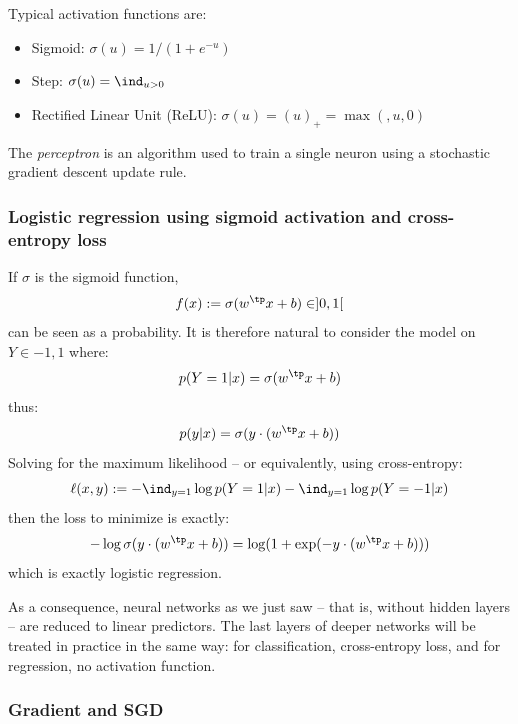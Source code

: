 \documentclass[toc, titlepaged]{../cs-classes/cs-classes}
\begin{document}
Typical activation functions are:
\begin{itemize}
    \item Sigmoid: $\sigma(u)=1/(1+e^{-u})$
    \item Step: $\sigma(u)=\ind_{u>0}$
    \item Rectified Linear Unit (ReLU): $\sigma(u)=(u)_+=\max(,u, 0)$
\end{itemize}

\begin{definition}[Perceptron]
    The \emph{perceptron} is an algorithm used to train a single neuron using a stochastic gradient descent update rule.
\end{definition}

\subsubsection{Logistic regression using sigmoid activation and cross-entropy loss}
If $\sigma$ is the sigmoid function, 
\begin{equation*}
    f(x):=\sigma(w^\tp x+b)\in]0, 1[
\end{equation*}
can be seen as a probability. It is therefore natural to consider the model on $Y\in{-1, 1}$ where:
\begin{equation*}
    p(Y=1|x)=\sigma(w^\tp x+b)
\end{equation*}
thus:
\begin{equation*}
    p(y|x)=\sigma(y\cdot(w^\tp x+b))
\end{equation*}
Solving for the maximum likelihood -- or equivalently, using cross-entropy:
\begin{equation*}
    \ell(x, y) := -\ind_{y=1}\log p(Y=1|x) - \ind_{y=1}\log p(Y=-1|x)
\end{equation*}
then the loss to minimize is exactly:
\begin{equation*}
    -\log\sigma(y\cdot(w^\tp x+b)) = \log(1+\exp(-y\cdot(w^\tp x+b)))
\end{equation*}
which is exactly logistic regression.

As a consequence, neural networks as we just saw -- that is, without hidden layers -- are reduced to linear predictors. The last layers of deeper networks will be treated in practice in the same way: for classification, cross-entropy loss, and for regression, no activation function.

\subsubsection{Gradient and SGD}
\end{document}
